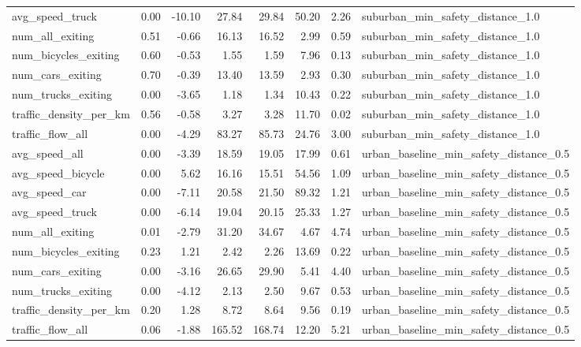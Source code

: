 \begin{table}[ht]
\begin{tabular}{lrrrrrrl}
  avg\_speed\_truck & 0.00 & -10.10 & 27.84 & 29.84 & 50.20 & 2.26 & suburban\_min\_safety\_distance\_1.0 \\ 
  num\_all\_exiting & 0.51 & -0.66 & 16.13 & 16.52 & 2.99 & 0.59 & suburban\_min\_safety\_distance\_1.0 \\ 
  num\_bicycles\_exiting & 0.60 & -0.53 & 1.55 & 1.59 & 7.96 & 0.13 & suburban\_min\_safety\_distance\_1.0 \\ 
  num\_cars\_exiting & 0.70 & -0.39 & 13.40 & 13.59 & 2.93 & 0.30 & suburban\_min\_safety\_distance\_1.0 \\ 
  num\_trucks\_exiting & 0.00 & -3.65 & 1.18 & 1.34 & 10.43 & 0.22 & suburban\_min\_safety\_distance\_1.0 \\ 
  traffic\_density\_per\_km & 0.56 & -0.58 & 3.27 & 3.28 & 11.70 & 0.02 & suburban\_min\_safety\_distance\_1.0 \\ 
  traffic\_flow\_all & 0.00 & -4.29 & 83.27 & 85.73 & 24.76 & 3.00 & suburban\_min\_safety\_distance\_1.0 \\ 
  avg\_speed\_all & 0.00 & -3.39 & 18.59 & 19.05 & 17.99 & 0.61 & urban\_baseline\_min\_safety\_distance\_0.5 \\ 
  avg\_speed\_bicycle & 0.00 & 5.62 & 16.16 & 15.51 & 54.56 & 1.09 & urban\_baseline\_min\_safety\_distance\_0.5 \\ 
  avg\_speed\_car & 0.00 & -7.11 & 20.58 & 21.50 & 89.32 & 1.21 & urban\_baseline\_min\_safety\_distance\_0.5 \\ 
  avg\_speed\_truck & 0.00 & -6.14 & 19.04 & 20.15 & 25.33 & 1.27 & urban\_baseline\_min\_safety\_distance\_0.5 \\ 
  num\_all\_exiting & 0.01 & -2.79 & 31.20 & 34.67 & 4.67 & 4.74 & urban\_baseline\_min\_safety\_distance\_0.5 \\ 
  num\_bicycles\_exiting & 0.23 & 1.21 & 2.42 & 2.26 & 13.69 & 0.22 & urban\_baseline\_min\_safety\_distance\_0.5 \\ 
  num\_cars\_exiting & 0.00 & -3.16 & 26.65 & 29.90 & 5.41 & 4.40 & urban\_baseline\_min\_safety\_distance\_0.5 \\ 
  num\_trucks\_exiting & 0.00 & -4.12 & 2.13 & 2.50 & 9.67 & 0.53 & urban\_baseline\_min\_safety\_distance\_0.5 \\ 
  traffic\_density\_per\_km & 0.20 & 1.28 & 8.72 & 8.64 & 9.56 & 0.19 & urban\_baseline\_min\_safety\_distance\_0.5 \\ 
  traffic\_flow\_all & 0.06 & -1.88 & 165.52 & 168.74 & 12.20 & 5.21 & urban\_baseline\_min\_safety\_distance\_0.5 \\ 

\end{tabular}
\end{table}
